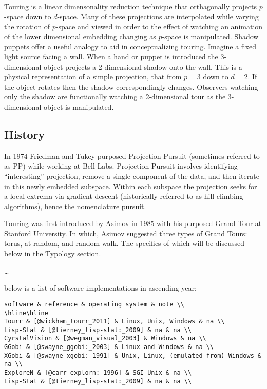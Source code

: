\documentclass{monashthesis}
\begin{document}
Touring is a linear dimensonality reduction technique that orthagonally
projects \(p\)-space down to \(d\)-space. Many of these projections are
interpolated while varying the rotation of \(p\)-space and viewed in
order to the effect of watching an animation of the lower dimensional
embedding changing as \(p\)-space is manipulated. Shadow puppets offer a
useful analogy to aid in conceptualizing touring. Imagine a fixed light
source facing a wall. When a hand or puppet is introduced the
3-dimensional object projects a 2-dimensional shadow onto the wall. This
is a physical representation of a simple projection, that from \(p=3\)
down to \(d=2\). If the object rotates then the shadow correspondingly
changes. Observers watching only the shadow are functionally watching a
2-dimensional tour as the 3-dimensional object is manipulated.

\subsection{History}\label{history}

In 1974 Friedman and Tukey purposed Projection
Pursuit\autocite{friedman_projection_1974} (sometimes referred to as PP)
while working at Bell Labs. Projection Pursuit involves identifying
``interesting'' projection, remove a single component of the data, and
then iterate in this newly embedded subspace. Within each subspace the
projection seeks for a local extrema via gradient descent (historically
referred to as hill climbing algorithms), hence the nomenclature
pursuit.

Touring was first introduced by Asimov in 1985 with his purposed Grand
Tour\autocite{asimov_grand_1985} at Stanford University. In which,
Asimov suggested three types of Grand Tours: torus, at-random, and
random-walk. The specifics of which will be discussed below in the
Typology section.

\ldots{}

below is a list of software implementations in ascending year:

\begin{verbatim}
software & reference & operating system & note \\
\hline\hline
Tourr & [@wickham_tourr_2011] & Linux, Unix, Windows & na \\
Lisp-Stat & [@tierney_lisp-stat:_2009] & na & na \\
CyrstalVision & [@wegman_visual_2003] & Windows & na \\
GGobi & [@swayne_ggobi:_2003] & Linux and Windows & na \\
XGobi & [@swayne_xgobi:_1991] & Unix, Linux, (emulated from) Windows & na \\
ExploreN & [@carr_explorn:_1996] & SGI Unix & na \\
Lisp-Stat & [@tierney_lisp-stat:_2009] & na & na \\
\end{verbatim}
\end{document}
